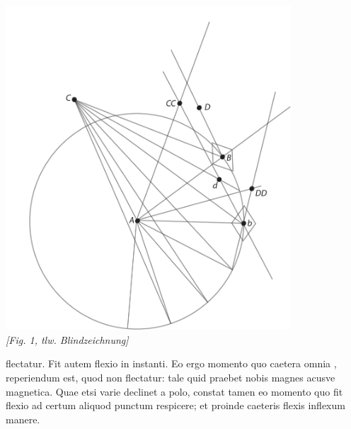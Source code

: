               \begin{center}
              \protect\vspace{5mm}
              \includegraphics[width=0.8\textwidth]{images/35_15_06_55r}
             \\ \protect\vspace{5mm} \textit{[Fig. 1, tlw. Blindzeichnung]}
              \end{center}
     \pstart\noindent flectatur. Fit autem flexio in instanti. Eo ergo momento quo caetera omnia , reperiendum est, quod non flectatur: tale quid praebet nobis magnes \protect{} acusve magnetica\protect{}. Quae etsi varie declinet a polo\protect{}, constat tamen eo momento quo fit flexio ad certum aliquod punctum respicere; et proinde caeteris flexis inflexum manere. 